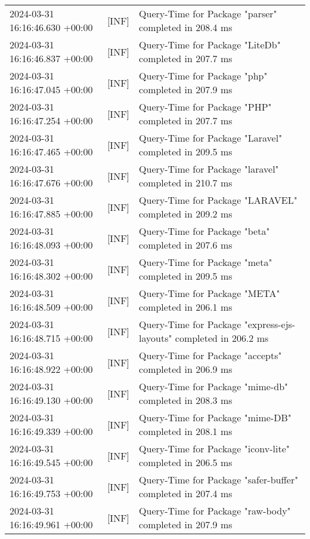 {{\begin{tabularx}{\textwidth}{|l|l|X|}
                    2024-03-31 16:16:46.630 +00:00 & [INF] & Query-Time for Package "parser" completed in 208.4 ms \\
                    2024-03-31 16:16:46.837 +00:00 & [INF] & Query-Time for Package "LiteDb" completed in 207.7 ms \\
                    2024-03-31 16:16:47.045 +00:00 & [INF] & Query-Time for Package "php" completed in 207.9 ms \\
                    2024-03-31 16:16:47.254 +00:00 & [INF] & Query-Time for Package "PHP" completed in 207.7 ms \\
                    2024-03-31 16:16:47.465 +00:00 & [INF] & Query-Time for Package "Laravel" completed in 209.5 ms \\
                    2024-03-31 16:16:47.676 +00:00 & [INF] & Query-Time for Package "laravel" completed in 210.7 ms \\
                    2024-03-31 16:16:47.885 +00:00 & [INF] & Query-Time for Package "LARAVEL" completed in 209.2 ms \\
                    2024-03-31 16:16:48.093 +00:00 & [INF] & Query-Time for Package "beta" completed in 207.6 ms \\
                    2024-03-31 16:16:48.302 +00:00 & [INF] & Query-Time for Package "meta" completed in 209.5 ms \\
                    2024-03-31 16:16:48.509 +00:00 & [INF] & Query-Time for Package "META" completed in 206.1 ms \\
                    2024-03-31 16:16:48.715 +00:00 & [INF] & Query-Time for Package "express-ejs-layouts" completed in 206.2 ms \\
                    2024-03-31 16:16:48.922 +00:00 & [INF] & Query-Time for Package "accepts" completed in 206.9 ms \\
                    2024-03-31 16:16:49.130 +00:00 & [INF] & Query-Time for Package "mime-db" completed in 208.3 ms \\
                    2024-03-31 16:16:49.339 +00:00 & [INF] & Query-Time for Package "mime-DB" completed in 208.1 ms \\
                    2024-03-31 16:16:49.545 +00:00 & [INF] & Query-Time for Package "iconv-lite" completed in 206.5 ms \\
                    2024-03-31 16:16:49.753 +00:00 & [INF] & Query-Time for Package "safer-buffer" completed in 207.4 ms \\
                    2024-03-31 16:16:49.961 +00:00 & [INF] & Query-Time for Package "raw-body" completed in 207.9 ms \\

\end{tabularx}}}
